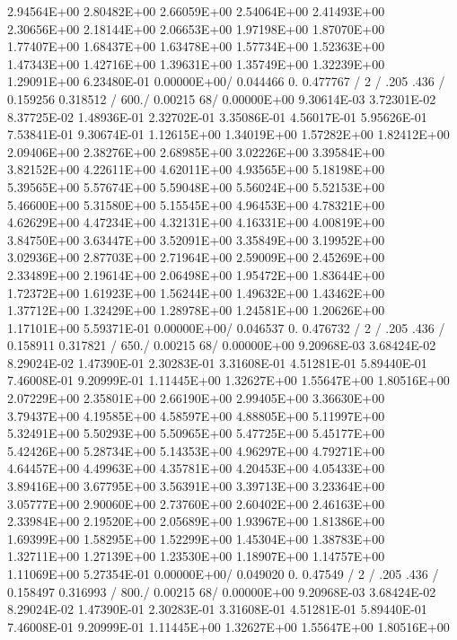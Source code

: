 \begin{ccode}
  2.94564E+00  2.80482E+00  2.66059E+00  2.54064E+00  2.41493E+00
  2.30656E+00  2.18144E+00  2.06653E+00  1.97198E+00  1.87070E+00
  1.77407E+00  1.68437E+00  1.63478E+00  1.57734E+00  1.52363E+00
  1.47343E+00  1.42716E+00  1.39631E+00  1.35749E+00  1.32239E+00
  1.29091E+00  6.23480E-01  0.00000E+00/
    0.044466  0.      0.477767  /
    2 /
   .205  .436 /
   0.159256   0.318512 /
 600./
 0.00215 68/
  0.00000E+00  9.30614E-03  3.72301E-02  8.37725E-02  1.48936E-01
  2.32702E-01  3.35086E-01  4.56017E-01  5.95626E-01  7.53841E-01
  9.30674E-01  1.12615E+00  1.34019E+00  1.57282E+00  1.82412E+00
  2.09406E+00  2.38276E+00  2.68985E+00  3.02226E+00  3.39584E+00
  3.82152E+00  4.22611E+00  4.62011E+00  4.93565E+00  5.18198E+00
  5.39565E+00  5.57674E+00  5.59048E+00  5.56024E+00  5.52153E+00
  5.46600E+00  5.31580E+00  5.15545E+00  4.96453E+00  4.78321E+00
  4.62629E+00  4.47234E+00  4.32131E+00  4.16331E+00  4.00819E+00
  3.84750E+00  3.63447E+00  3.52091E+00  3.35849E+00  3.19952E+00
  3.02936E+00  2.87703E+00  2.71964E+00  2.59009E+00  2.45269E+00
  2.33489E+00  2.19614E+00  2.06498E+00  1.95472E+00  1.83644E+00
  1.72372E+00  1.61923E+00  1.56244E+00  1.49632E+00  1.43462E+00
  1.37712E+00  1.32429E+00  1.28978E+00  1.24581E+00  1.20626E+00
  1.17101E+00  5.59371E-01  0.00000E+00/
    0.046537  0.   0.476732  /
    2 /
   .205  .436  /
   0.158911        0.317821  /
 650./
 0.00215 68/
  0.00000E+00  9.20968E-03  3.68424E-02  8.29024E-02  1.47390E-01
  2.30283E-01  3.31608E-01  4.51281E-01  5.89440E-01  7.46008E-01
  9.20999E-01  1.11445E+00  1.32627E+00  1.55647E+00  1.80516E+00
  2.07229E+00  2.35801E+00  2.66190E+00  2.99405E+00  3.36630E+00
  3.79437E+00  4.19585E+00  4.58597E+00  4.88805E+00  5.11997E+00
  5.32491E+00  5.50293E+00  5.50965E+00  5.47725E+00  5.45177E+00
  5.42426E+00  5.28734E+00  5.14353E+00  4.96297E+00  4.79271E+00
  4.64457E+00  4.49963E+00  4.35781E+00  4.20453E+00  4.05433E+00
  3.89416E+00  3.67795E+00  3.56391E+00  3.39713E+00  3.23364E+00
  3.05777E+00  2.90060E+00  2.73760E+00  2.60402E+00  2.46163E+00
  2.33984E+00  2.19520E+00  2.05689E+00  1.93967E+00  1.81386E+00
  1.69399E+00  1.58295E+00  1.52299E+00  1.45304E+00  1.38783E+00
  1.32711E+00  1.27139E+00  1.23530E+00  1.18907E+00  1.14757E+00
  1.11069E+00  5.27354E-01  0.00000E+00/
    0.049020  0.     0.47549 /
    2 /
   .205  .436 /
   0.158497        0.316993  /
 800./
 0.00215 68/
  0.00000E+00  9.20968E-03  3.68424E-02  8.29024E-02  1.47390E-01
  2.30283E-01  3.31608E-01  4.51281E-01  5.89440E-01  7.46008E-01
  9.20999E-01  1.11445E+00  1.32627E+00  1.55647E+00  1.80516E+00

\end{ccode}
